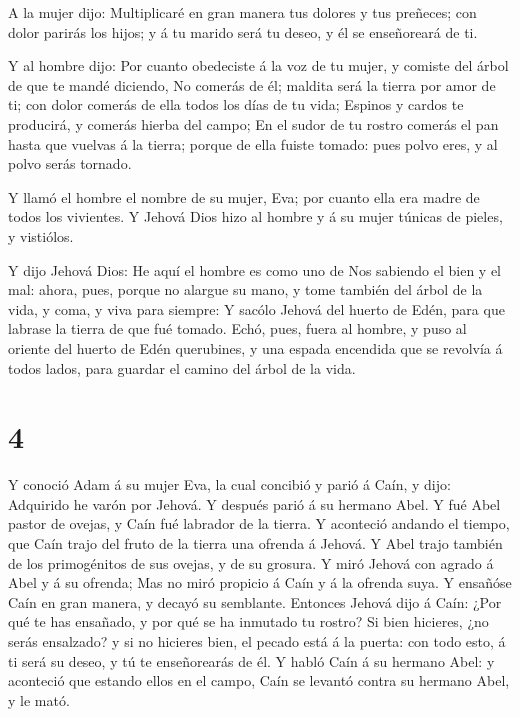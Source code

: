  A la mujer dijo: Multiplicaré en gran manera tus dolores y
tus preñeces; con dolor parirás los hijos; y á tu marido será tu deseo,
y él se enseñoreará de ti.

 Y al hombre dijo: Por cuanto obedeciste á la voz de tu
mujer, y comiste del árbol de que te mandé diciendo, No comerás de él;
maldita será la tierra por amor de ti; con dolor comerás de ella todos
los días de tu vida;  Espinos y cardos te producirá, y
comerás hierba del campo;  En el sudor de tu rostro comerás
el pan hasta que vuelvas á la tierra; porque de ella fuiste tomado: pues
polvo eres, y al polvo serás tornado.

 Y llamó el hombre el nombre de su mujer, Eva; por cuanto
ella era madre de todos los vivientes.  Y Jehová Dios hizo
al hombre y á su mujer túnicas de pieles, y vistiólos.

 Y dijo Jehová Dios: He aquí el hombre es como uno de Nos
sabiendo el bien y el mal: ahora, pues, porque no alargue su mano, y
tome también del árbol de la vida, y coma, y viva para siempre:
 Y sacólo Jehová del huerto de Edén, para que labrase la
tierra de que fué tomado.  Echó, pues, fuera al hombre, y
puso al oriente del huerto de Edén querubines, y una espada encendida
que se revolvía á todos lados, para guardar el camino del árbol de la
vida.

\hypertarget{section-3}{%
\section{4}\label{section-3}}

 Y conoció Adam á su mujer Eva, la cual concibió y parió á
Caín, y dijo: Adquirido he varón por Jehová.  Y después
parió á su hermano Abel. Y fué Abel pastor de ovejas, y Caín fué
labrador de la tierra.  Y aconteció andando el tiempo, que
Caín trajo del fruto de la tierra una ofrenda á Jehová.  Y
Abel trajo también de los primogénitos de sus ovejas, y de su grosura. Y
miró Jehová con agrado á Abel y á su ofrenda;  Mas no miró
propicio á Caín y á la ofrenda suya. Y ensañóse Caín en gran manera, y
decayó su semblante.  Entonces Jehová dijo á Caín: ¿Por qué
te has ensañado, y por qué se ha inmutado tu rostro?  Si
bien hicieres, ¿no serás ensalzado? y si no hicieres bien, el pecado
está á la puerta: con todo esto, á ti será su deseo, y tú te
enseñorearás de él.  Y habló Caín á su hermano Abel: y
aconteció que estando ellos en el campo, Caín se levantó contra su
hermano Abel, y le mató.

